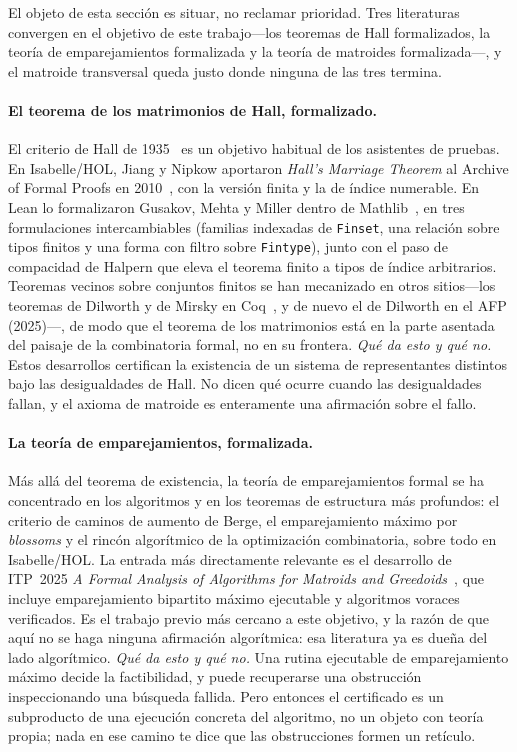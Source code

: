 \documentclass[11pt]{article}
\newcommand{\lean}[1]{\texttt{#1}}
\begin{document}
El objeto de esta sección es situar, no reclamar prioridad. Tres literaturas convergen en el
objetivo de este trabajo---los teoremas de Hall formalizados, la teoría de emparejamientos
formalizada y la teoría de matroides formalizada---, y el matroide transversal queda justo donde
ninguna de las tres termina.

\paragraph{El teorema de los matrimonios de Hall, formalizado.} El criterio de Hall de
1935~\cite{hall} es un objetivo habitual de los asistentes de pruebas. En Isabelle/HOL, Jiang y
Nipkow aportaron \emph{Hall's Marriage Theorem} al Archive of Formal Proofs en 2010~\cite{afphall},
con la versión finita y la de índice numerable. En Lean lo formalizaron Gusakov, Mehta y Miller
dentro de Mathlib~\cite{gusakov}, en tres formulaciones intercambiables (familias indexadas de
\lean{Finset}, una relación sobre tipos finitos y una forma con filtro sobre \lean{Fintype}), junto
con el paso de compacidad de Halpern que eleva el teorema finito a tipos de índice arbitrarios.
Teoremas vecinos sobre conjuntos finitos se han mecanizado en otros sitios---los teoremas de
Dilworth y de Mirsky en Coq~\cite{coqdilworth}, y de nuevo el de Dilworth en el AFP (2025)---, de
modo que el teorema de los matrimonios está en la parte asentada del paisaje de la combinatoria
formal, no en su frontera. \emph{Qué da esto y qué no.} Estos desarrollos certifican la existencia
de un sistema de representantes distintos bajo las desigualdades de Hall. No dicen qué ocurre
cuando las desigualdades fallan, y el axioma de matroide es enteramente una afirmación sobre el
fallo.

\paragraph{La teoría de emparejamientos, formalizada.} Más allá del teorema de existencia, la
teoría de emparejamientos formal se ha concentrado en los algoritmos y en los teoremas de
estructura más profundos: el criterio de caminos de aumento de Berge, el emparejamiento máximo por
\emph{blossoms} y el rincón algorítmico de la optimización combinatoria, sobre todo en
Isabelle/HOL. La entrada más directamente relevante es el desarrollo de ITP~2025 \emph{A Formal
Analysis of Algorithms for Matroids and Greedoids}~\cite{itp2025}, que incluye emparejamiento
bipartito máximo ejecutable y algoritmos voraces verificados. Es el trabajo previo más cercano a
este objetivo, y la razón de que aquí no se haga ninguna afirmación algorítmica: esa literatura ya
es dueña del lado algorítmico. \emph{Qué da esto y qué no.} Una rutina ejecutable de emparejamiento
máximo decide la factibilidad, y puede recuperarse una obstrucción inspeccionando una búsqueda
fallida. Pero entonces el certificado es un subproducto de una ejecución concreta del algoritmo, no
un objeto con teoría propia; nada en ese camino te dice que las obstrucciones formen un retículo.
\end{document}
